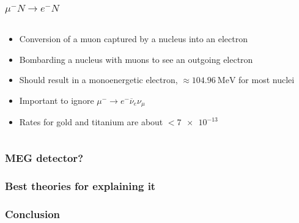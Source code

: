\documentclass[11pt]{beamer}
\begin{document}
\begin{frame}
\begin{columns}[c]
\begin{column}{0.4\textwidth}
        \end{column}
    \end{columns}
\end{frame}


\begin{frame}
    \frametitle{$\mu^- N \rightarrow e^- N$}

    \begin{columns}[c]
        \begin{column}{0.6\textwidth}
            \begin{itemize}
                \item Conversion of a muon captured by a nucleus into an electron
                \item Bombarding a nucleus with muons to see an outgoing electron
                \item Should result in a monoenergetic electron, $\approx\SI{104.96}{\mega\electronvolt}$ for most nuclei
                \item Important to ignore $\mu^-\rightarrow e^- \overline{\nu}_e \nu_\mu$
                \item Rates for gold and titanium are about $<\num{7e-13}$
            \end{itemize}
        \end{column}
    \end{columns}
    

\end{frame}

\begin{frame}
    \frametitle{MEG detector?}

    

\end{frame}

\begin{frame}
    \frametitle{Best theories for explaining it}

    

\end{frame}

\begin{frame}
    \frametitle{Conclusion}

    

\end{frame}
\end{document}
